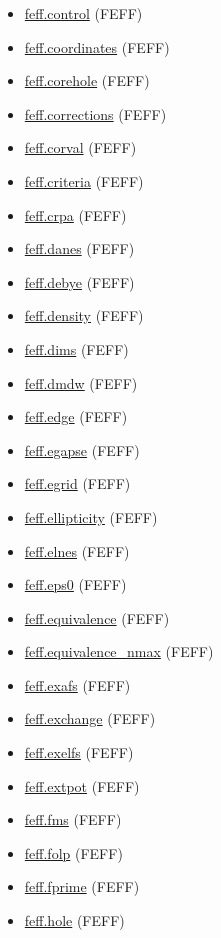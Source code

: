 \documentclass[11pt]{article}
\begin{document}
\begin{itemize}
\item \hyperref[kw:feff-control]{feff.control} (FEFF)
\item \hyperref[kw:feff-coordinates]{feff.coordinates} (FEFF)
\item \hyperref[kw:feff-corehole]{feff.corehole} (FEFF)
\item \hyperref[kw:feff-corrections]{feff.corrections} (FEFF)
\item \hyperref[kw:feff-corval]{feff.corval} (FEFF)
\item \hyperref[kw:feff-criteria]{feff.criteria} (FEFF)
\item \hyperref[kw:feff-crpa]{feff.crpa} (FEFF)
\item \hyperref[kw:feff-danes]{feff.danes} (FEFF)
\item \hyperref[kw:feff-debye]{feff.debye} (FEFF)
\item \hyperref[kw:feff-density]{feff.density} (FEFF)
\item \hyperref[kw:feff-dims]{feff.dims} (FEFF)
\item \hyperref[kw:feff-dmdw]{feff.dmdw} (FEFF)
\item \hyperref[kw:feff-edge]{feff.edge} (FEFF)
\item \hyperref[kw:feff-egapse]{feff.egapse} (FEFF)
\item \hyperref[kw:feff-egrid]{feff.egrid} (FEFF)
\item \hyperref[kw:feff-ellipticity]{feff.ellipticity} (FEFF)
\item \hyperref[kw:feff-elnes]{feff.elnes} (FEFF)
\item \hyperref[kw:feff-eps0]{feff.eps0} (FEFF)
\item \hyperref[kw:feff-equivalence]{feff.equivalence} (FEFF)
\item \hyperref[kw:feff-equivalence-nmax]{feff.equivalence\_nmax} (FEFF)
\item \hyperref[kw:feff-exafs]{feff.exafs} (FEFF)
\item \hyperref[kw:feff-exchange]{feff.exchange} (FEFF)
\item \hyperref[kw:feff-exelfs]{feff.exelfs} (FEFF)
\item \hyperref[kw:feff-extpot]{feff.extpot} (FEFF)
\item \hyperref[kw:feff-fms]{feff.fms} (FEFF)
\item \hyperref[kw:feff-folp]{feff.folp} (FEFF)
\item \hyperref[kw:feff-fprime]{feff.fprime} (FEFF)
\item \hyperref[kw:feff-hole]{feff.hole} (FEFF)

\end{itemize}
\end{document}
